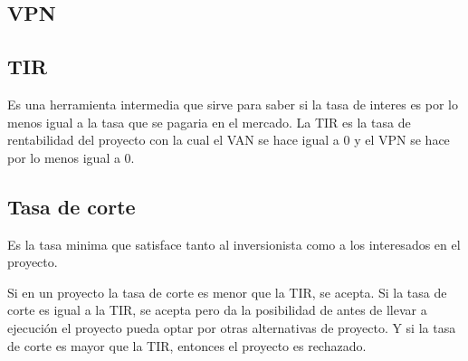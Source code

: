 \documentclass[a4paper, 11pt, oneside]{article}
\begin{document}
\subsection{VPN}

\subsection{TIR}

Es una herramienta intermedia que sirve para saber si la tasa de interes es por lo menos igual a la tasa que se pagaria en el mercado. La TIR es la tasa de rentabilidad del proyecto con la cual el VAN se hace igual a 0 y el VPN se hace por lo menos igual a 0.

\subsection{Tasa de corte}

Es la tasa minima que satisface tanto al inversionista como a los interesados en el proyecto.

Si en un proyecto la tasa de corte es menor que la TIR, se acepta. Si la tasa de corte es igual a la TIR, se acepta pero da la posibilidad de antes de llevar a ejecución el proyecto pueda optar por otras alternativas de proyecto. Y si la tasa de corte es mayor que la TIR, entonces el proyecto es rechazado.
\end{document}
